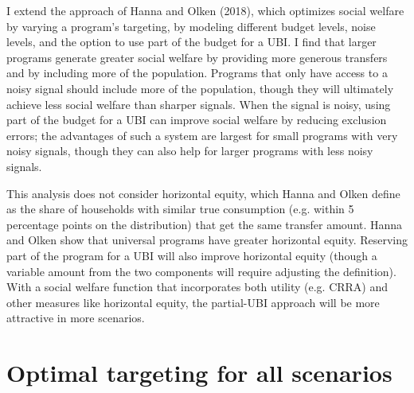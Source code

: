 \documentclass[12pt]{article}
\begin{document}
I extend the approach of Hanna and Olken (2018), which optimizes social welfare 
by varying a program's targeting, by modeling different budget levels, noise 
levels, and the option to use part of the budget for a UBI. I find that larger 
programs generate greater social welfare by providing more generous transfers 
and by including more of the population. Programs that only have access to a 
noisy signal should include more of the population, though they will ultimately 
achieve less social welfare than sharper signals. When the signal is noisy, 
using part of the budget for a UBI can improve social welfare by reducing 
exclusion errors; the advantages of such a system are largest for small 
programs with very noisy signals, though they can also help for larger programs 
with less noisy signals.

This analysis does not consider horizontal equity, which Hanna and Olken define 
as the share of households with similar true consumption (e.g. within 5 
percentage points on the distribution) that get the same transfer amount. Hanna 
and Olken show that universal programs have greater horizontal equity. 
Reserving part of the program for a UBI will also improve horizontal equity 
(though a variable amount from the two components will require adjusting the 
definition). With a social welfare function that incorporates both utility 
(e.g. CRRA) and other measures like horizontal equity, the partial-UBI approach 
will be more attractive in more scenarios.


\appendix
\section{Optimal targeting for all scenarios} \label{sec:appendix_all_scenarios}


\clearpage


\end{document}
